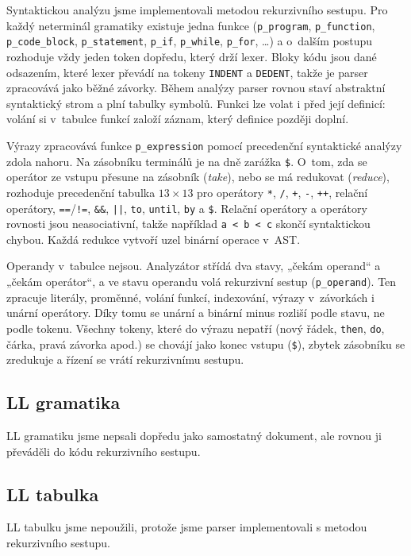 \documentclass[a4paper,11pt]{article}
\begin{document}
Syntaktickou analýzu jsme implementovali metodou rekurzivního sestupu. Pro každý neterminál gramatiky existuje jedna
funkce (\texttt{p\_program}, \texttt{p\_function}, \texttt{p\_code\_block},
\texttt{p\_statement}, \texttt{p\_if}, \texttt{p\_while}, \texttt{p\_for},
\ldots) a o~dalším postupu rozhoduje vždy jeden token dopředu, který drží
lexer. Bloky kódu jsou dané odsazením, které lexer převádí na tokeny
\texttt{INDENT} a \texttt{DEDENT}, takže je parser zpracovává jako běžné
závorky. Během analýzy parser rovnou staví abstraktní syntaktický strom
a plní tabulky symbolů. Funkci lze volat i před její definicí: volání si
v~tabulce funkcí založí záznam, který definice později doplní.

Výrazy zpracovává funkce \texttt{p\_expression} pomocí precedenční
syntaktické analýzy zdola nahoru. Na zásobníku terminálů je na dně
zarážka \texttt{\$}. O~tom, zda se operátor ze vstupu přesune na zásobník
(\emph{take}), nebo se má redukovat (\emph{reduce}), rozhoduje precedenční
tabulka $13\times13$ pro operátory \texttt{*}, \texttt{/}, \texttt{+},
\texttt{-}, \texttt{++}, relační operátory, \texttt{==}/\texttt{!=},
\texttt{\&\&}, \texttt{||}, \texttt{to}, \texttt{until}, \texttt{by}
a \texttt{\$}. Relační operátory a operátory rovnosti jsou neasociativní,
takže například \texttt{a < b < c} skončí syntaktickou chybou. Každá
redukce vytvoří uzel binární operace v~AST\@.

Operandy v~tabulce nejsou. Analyzátor střídá dva stavy, „čekám operand“
a „čekám operátor“, a ve stavu operandu volá rekurzivní sestup
(\texttt{p\_operand}). Ten zpracuje literály, proměnné, volání funkcí,
indexování, výrazy v~závorkách i unární operátory. Díky tomu se unární
a binární minus rozliší podle stavu, ne podle tokenu. Všechny tokeny, které do výrazu nepatří (nový řádek, \texttt{then}, \texttt{do}, čárka, pravá závorka
apod.) se chovájí jako konec vstupu (\texttt{\$}), zbytek zásobníku se
zredukuje a řízení se vrátí rekurzivnímu sestupu.

\subsection{LL gramatika}
LL gramatiku jsme nepsali dopředu jako samostatný dokument, ale rovnou ji
převáděli do kódu rekurzivního sestupu.

\subsection{LL tabulka}
LL tabulku jsme nepoužili, protože jsme parser implementovali s metodou rekurzivního sestupu.
\end{document}
